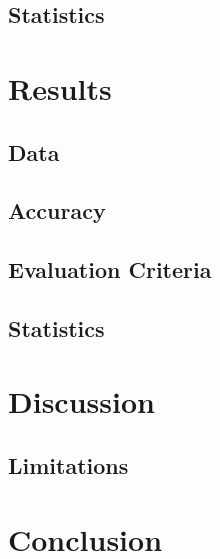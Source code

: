 \documentclass{article}
\begin{document}
\subsection{Statistics}



\section{Results}

\subsection{Data} %
%
\subsection{Accuracy}
%
\subsection{Evaluation Criteria}
%
\subsection{Statistics}
%



\section{Discussion}
%
\subsection{Limitations}



\section{Conclusion}
%





\end{document}
